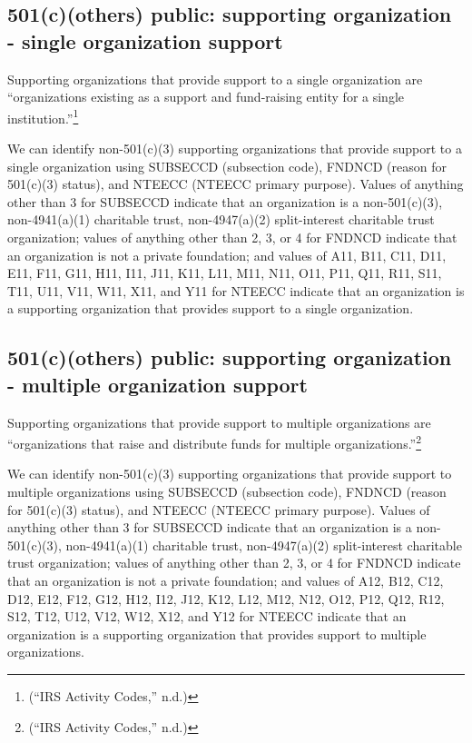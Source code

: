 \documentclass[
  letterpaper,
  DIV=11,
  numbers=noendperiod,
  oneside]{scrreprt}
\begin{document}
\hypertarget{cothers-public-supporting-organization---single-organization-support}{%
\subsection{501(c)(others) public: supporting organization - single
organization
support}\label{cothers-public-supporting-organization---single-organization-support}}

Supporting organizations that provide support to a single organization
are ``organizations existing as a support and fund-raising entity for a
single institution.''\footnote{({``IRS Activity Codes,''} n.d.)}

We can identify non-501(c)(3) supporting organizations that provide
support to a single organization using SUBSECCD (subsection code),
FNDNCD (reason for 501(c)(3) status), and NTEECC (NTEECC primary
purpose). Values of anything other than 3 for SUBSECCD indicate that an
organization is a non-501(c)(3), non-4941(a)(1) charitable trust,
non-4947(a)(2) split-interest charitable trust organization; values of
anything other than 2, 3, or 4 for FNDNCD indicate that an organization
is not a private foundation; and values of A11, B11, C11, D11, E11, F11,
G11, H11, I11, J11, K11, L11, M11, N11, O11, P11, Q11, R11, S11, T11,
U11, V11, W11, X11, and Y11 for NTEECC indicate that an organization is
a supporting organization that provides support to a single
organization.

\hypertarget{cothers-public-supporting-organization---multiple-organization-support}{%
\subsection{501(c)(others) public: supporting organization - multiple
organization
support}\label{cothers-public-supporting-organization---multiple-organization-support}}

Supporting organizations that provide support to multiple organizations
are ``organizations that raise and distribute funds for multiple
organizations.''\footnote{({``IRS Activity Codes,''} n.d.)}

We can identify non-501(c)(3) supporting organizations that provide
support to multiple organizations using SUBSECCD (subsection code),
FNDNCD (reason for 501(c)(3) status), and NTEECC (NTEECC primary
purpose). Values of anything other than 3 for SUBSECCD indicate that an
organization is a non-501(c)(3), non-4941(a)(1) charitable trust,
non-4947(a)(2) split-interest charitable trust organization; values of
anything other than 2, 3, or 4 for FNDNCD indicate that an organization
is not a private foundation; and values of A12, B12, C12, D12, E12, F12,
G12, H12, I12, J12, K12, L12, M12, N12, O12, P12, Q12, R12, S12, T12,
U12, V12, W12, X12, and Y12 for NTEECC indicate that an organization is
a supporting organization that provides support to multiple
organizations.
\end{document}
